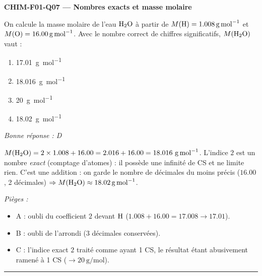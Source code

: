 \documentclass[11pt,a4paper]{article}
\begin{document}
\noindent\textbf{CHIM-F01-Q07 --- Nombres exacts et masse molaire}\par
On calcule la masse molaire de l'eau $\ce{H2O}$ à partir de $M(\ce{H}) = \qty{1.008}{\gram\per\mole}$ et $M(\ce{O}) = \qty{16.00}{\gram\per\mole}$. Avec le nombre correct de chiffres significatifs, $M(\ce{H2O})$ vaut :
\begin{enumerate}[label=\Alph*)]
\item \qty{17.01}{\gram\per\mole}
\item \qty{18.016}{\gram\per\mole}
\item \qty{20}{\gram\per\mole}
\item \qty{18.02}{\gram\per\mole}
\end{enumerate}
\textit{Bonne réponse : D}\par
$M(\ce{H2O}) = 2\times\num{1.008} + \num{16.00} = \num{2.016} + \num{16.00} = \num{18.016}\ \si{\gram\per\mole}$. L'indice $2$ est un nombre \emph{exact} (comptage d'atomes) : il possède une infinité de CS et ne limite rien. C'est une addition : on garde le nombre de décimales du moins précis ($\num{16.00}$, 2 décimales) $\Rightarrow M(\ce{H2O}) \approx \qty{18.02}{\gram\per\mole}$.\par
\textit{Pièges :}
\begin{itemize}
\item A : oubli du coefficient $2$ devant $\ce{H}$ ($\num{1.008}+\num{16.00} = \num{17.008} \to \num{17.01}$).
\item B : oubli de l'arrondi (3 décimales conservées).
\item C : l'indice exact $2$ traité comme ayant 1 CS, le résultat étant abusivement ramené à 1 CS ($\to \qty{20}{\gram\per\mole}$).
\end{itemize}
\vspace{6pt}\hrule\vspace{8pt}
\end{document}
